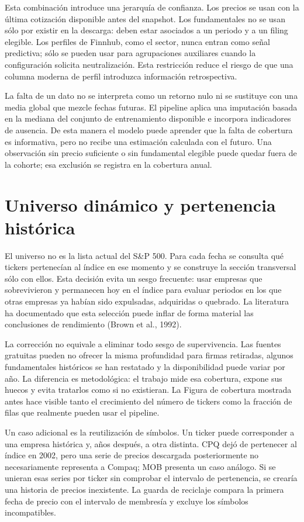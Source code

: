 Esta combinación introduce una jerarquía de confianza. Los precios se usan con la última cotización
disponible antes del snapshot. Los fundamentales no se usan sólo por existir en la descarga: deben
estar asociados a un periodo y a un filing elegible. Los perfiles de Finnhub, como el sector, nunca
entran como señal predictiva; sólo se pueden usar para agrupaciones auxiliares cuando la
configuración solicita neutralización. Esta restricción reduce el riesgo de que una columna moderna
de perfil introduzca información retrospectiva.

La falta de un dato no se interpreta como un retorno nulo ni se sustituye con una media global que
mezcle fechas futuras. El pipeline aplica una imputación basada en la mediana del conjunto de
entrenamiento disponible e incorpora indicadores de ausencia. De esta manera el modelo puede
aprender que la falta de cobertura es informativa, pero no recibe una estimación calculada con el
futuro. Una observación sin precio suficiente o sin fundamental elegible puede quedar fuera de la
cohorte; esa exclusión se registra en la cobertura anual.

\section{Universo dinámico y pertenencia histórica}

El universo no es la lista actual del S\&P 500. Para cada fecha se consulta qué tickers pertenecían
al índice en ese momento y se construye la sección transversal sólo con ellos. Esta decisión evita
un sesgo frecuente: usar empresas que sobrevivieron y permanecen hoy en el índice para evaluar
periodos en los que otras empresas ya habían sido expulsadas, adquiridas o quebrado. La literatura
ha documentado que esta selección puede inflar de forma material las conclusiones de rendimiento
(Brown et al., 1992).

La corrección no equivale a eliminar todo sesgo de supervivencia. Las fuentes gratuitas pueden no
ofrecer la misma profundidad para firmas retiradas, algunos fundamentales históricos se han
restatado y la disponibilidad puede variar por año. La diferencia es metodológica: el trabajo mide
esa cobertura, expone sus huecos y evita tratarlos como si no existieran. La Figura de cobertura
mostrada antes hace visible tanto el crecimiento del número de tickers como la fracción de filas que
realmente pueden usar el pipeline.

Un caso adicional es la reutilización de símbolos. Un ticker puede corresponder a una empresa
histórica y, años después, a otra distinta. CPQ dejó de pertenecer al índice en 2002, pero una serie
de precios descargada posteriormente no necesariamente representa a Compaq; MOB presenta un caso
análogo. Si se unieran esas series por ticker sin comprobar el intervalo de pertenencia, se crearía
una historia de precios inexistente. La guarda de reciclaje compara la primera fecha de precio con
el intervalo de membresía y excluye los símbolos incompatibles.

